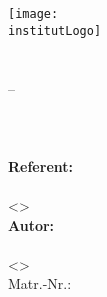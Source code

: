 
\begin{titlepage}
  \begin{center}
    \texttt{[image: \\institutLogo]}\\[4ex]

    \huge{\institutName}\\[1ex]
    \LARGE{\fakultaet}\\[1ex]
    \Large{{\studiengang} -- \studiengangKuerzel}\\[50pt]

    \huge{\textbf{\titel}}\\[3ex]
    \Large{\textbf{\untertitel}}\\[1ex]
    \Large{\untertitelEnglisch}\\[50pt]

    \large
    \textbf{Referent:}\\
    \\
    <>\\[3ex]

    \textbf{Autor:}\\
    \autorName\\
    <\autorEmail>\\
    Matr.-Nr.: \autorMatnr\\[50pt]

    \zeitstempel
  \end{center}
\end{titlepage}
